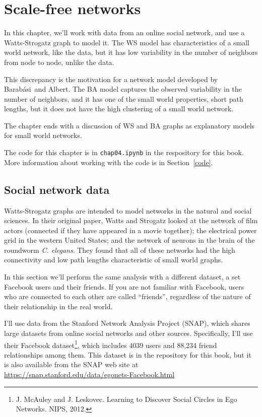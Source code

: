 \documentclass[12pt]{book}
\theoremstyle{exercise}
\begin{document}
\chapter{Scale-free networks}
\label{scale-free}

\newcommand{\Barabasi}{Barab\'{a}si}

In this chapter, we'll work with data from an online social network, and use a
Watts-Strogatz graph to model it.  The WS model has characteristics of
a small world network, like the data, but it has low
variability in the number of neighbors from node to node,
unlike the data.

This discrepancy is the motivation for a network model developed
by \Barabasi~and Albert.  The BA model captures the observed variability
in the number of neighbors, and it has one of the small world
properties, short path lengths, but it does not have the high
clustering of a small world network.

The chapter ends with a discussion of WS and BA graphs as explanatory
models for small world networks.

The code for this chapter is in {\tt chap04.ipynb} in the respository
for this book.  More information about working with the code is
in Section~\ref{code}.


\section{Social network data}

Watts-Strogatz graphs are intended to model networks in the natural
and social sciences.  In their original paper, Watts and Strogatz
looked at the network of film actors (connected if they have appeared
in a movie together); the electrical power grid in the western United
States; and the network of neurons in the brain of the roundworm
{\it C. elegans}.  They found that all of these networks had the
high connectivity and low path lengths characteristic of small world
graphs.

In this section we'll perform the same analysis with a different
dataset, a set Facebook users and their friends.  If you are not
familiar with Facebook, users who are connected to each other are
called ``friends'', regardless of the nature of their relationship in
the real world.

I'll use data from the Stanford Network Analysis Project (SNAP), which
shares large datasets from online social networks and other sources.
Specifically, I'll use their Facebook dataset\footnote{J. McAuley and
  J. Leskovec. Learning to Discover Social Circles in Ego
  Networks. NIPS, 2012.}, which includes 4039 users and 88,234
friend relationships among them.  This dataset is in the repository
for this book, but it is also available from the SNAP web site at
\url{https://snap.stanford.edu/data/egonets-Facebook.html}
\end{document}

